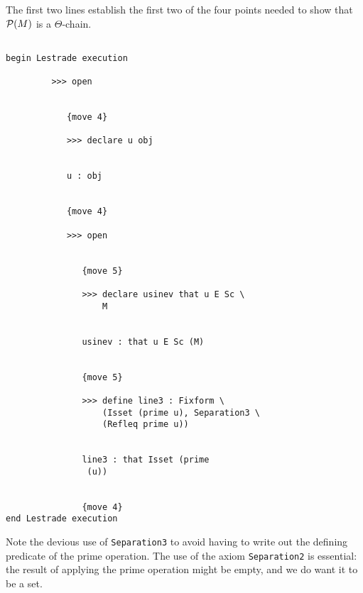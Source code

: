\documentclass[12pt]{article}
\begin{document}
The first two lines establish the first two of the four points needed to show that ${\cal P}(M)$ is a $\Theta$-chain.

\begin{verbatim}

begin Lestrade execution

         >>> open


            {move 4}

            >>> declare u obj


            u : obj


            {move 4}

            >>> open


               {move 5}

               >>> declare usinev that u E Sc \
                   M


               usinev : that u E Sc (M)


               {move 5}

               >>> define line3 : Fixform \
                   (Isset (prime u), Separation3 \
                   (Refleq prime u))


               line3 : that Isset (prime 
                (u))


               {move 4}
end Lestrade execution
\end{verbatim}

Note the devious use of {\tt Separation3} to avoid having to write out the defining predicate of the prime operation.  The use of the axiom
{\tt Separation2} is essential:  the result of applying the prime operation might be empty, and we do want it to be a set.
\end{document}

